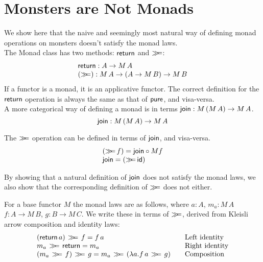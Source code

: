 \section{Monsters are Not Monads}



We show here that the naive and seemingly most natural way of defining monad operations on monsters doesn't satisfy the monad laws. \\

The Monad class has two methods: $\mathsf{return}$ and $\mathbin{\gg\!\!=}$:
$$
\begin{array}{l}
\mathsf{return} : A \rightarrow M\, A \\
(\mathbin{\gg\!\!=}) : M\, A \rightarrow (A \rightarrow M\, B) \rightarrow M\, B
\end{array}
$$
If a functor is a monad, it is an applicative functor. The correct definition for the $\mathsf{return}$ operation is always the same as that of $\mathsf{pure}$, and visa-versa. \\

A more categorical way of defining a monad is in terms $\mathsf{join} : M\,(M\, A) \rightarrow M\, A$.
$$
\mathsf{join} : M\,(M\, A) \rightarrow M\, A
$$

The $\mathbin{\gg\!\!=}$ operation can be defined in terms of $\mathsf{join}$, and visa-versa.
$$
\begin{array}{l}
(\mathbin{\gg\!\!=}\, f) = \mathsf{join} \circ M f \\
\mathsf{join} = (\mathbin{\gg\!\!=}\,\mathsf{id})
\end{array}
$$

By showing that a natural definition of $\mathsf{join}$ does not satisfy the monad laws, we also show that the corresponding definition of $\mathbin{\gg\!\!=}$ does not either.

For a base functor $M$ the monad laws are as follows, where $a:A$, $m_a : M\, A$
$f : A \rightarrow M\, B$, $g : B \rightarrow M\,C$. We write these in terms of $\mathbin{\gg\!\!=}$, derived from Kleisli arrow composition and identity laws:
$$
\begin{array}{l@{\qquad}l}
(\return\, a)\, \bind \, f = f\, a
  & \mbox{Left identity} \\
m_a\, \bind \, \return = m_a
  & \mbox{Right identity} \\
(m_a \, \bind \, f)\, \bind \, g = m_a\, \bind\, (\lambda a.  f\, a \, \bind \, g)
  & \mbox{Composition} \\
\end{array}
$$

%

